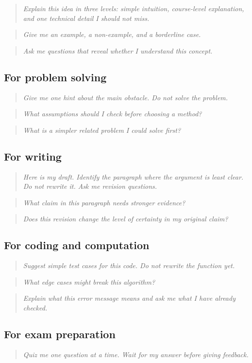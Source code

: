 \documentclass{SIAMbook2023}
\newcommand{\studentprompt}[1]{\begin{quote}\small\itshape #1\end{quote}}
\begin{document}
\studentprompt{Explain this idea in three levels: simple intuition, course-level explanation, and one technical detail I should not miss.}

\studentprompt{Give me an example, a non-example, and a borderline case.}

\studentprompt{Ask me questions that reveal whether I understand this concept.}

\subsection*{For problem solving}

\studentprompt{Give me one hint about the main obstacle. Do not solve the problem.}

\studentprompt{What assumptions should I check before choosing a method?}

\studentprompt{What is a simpler related problem I could solve first?}

\subsection*{For writing}

\studentprompt{Here is my draft. Identify the paragraph where the argument is least clear. Do not rewrite it. Ask me revision questions.}

\studentprompt{What claim in this paragraph needs stronger evidence?}

\studentprompt{Does this revision change the level of certainty in my original claim?}

\subsection*{For coding and computation}

\studentprompt{Suggest simple test cases for this code. Do not rewrite the function yet.}

\studentprompt{What edge cases might break this algorithm?}

\studentprompt{Explain what this error message means and ask me what I have already checked.}

\subsection*{For exam preparation}

\studentprompt{Quiz me one question at a time. Wait for my answer before giving feedback.}
\end{document}

